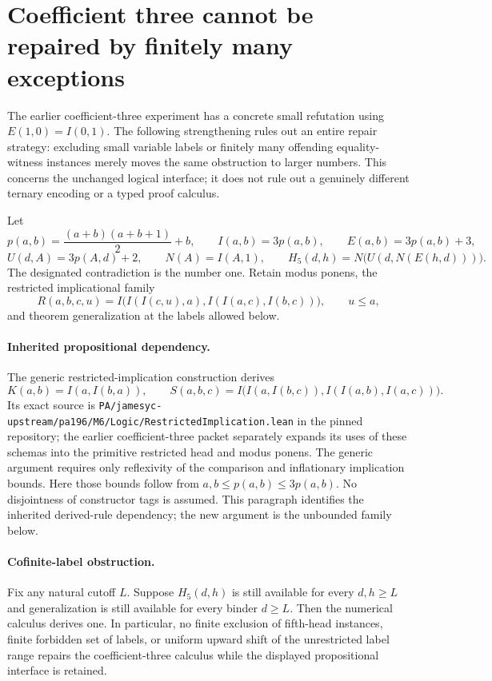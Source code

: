 \section{Coefficient three cannot be repaired by finitely many exceptions}
\label{sec:cofinite-collision}

The earlier coefficient-three experiment has a concrete small refutation
using $E(1,0)=I(0,1)$. The following strengthening rules out an entire
repair strategy: excluding small variable labels or finitely many offending
equality-witness instances merely moves the same obstruction to larger
numbers. This concerns the unchanged logical interface; it does not rule
out a genuinely different ternary encoding or a typed proof calculus.

Let
\[
 p(a,b)=\frac{(a+b)(a+b+1)}2+b,\qquad
 I(a,b)=3p(a,b),\qquad E(a,b)=3p(a,b)+3,
\]
\[
 U(d,A)=3p(A,d)+2,\qquad N(A)=I(A,1),\qquad
 H_5(d,h)=N\bigl(U(d,N(E(h,d)))\bigr).
\]
The designated contradiction is the number one. Retain modus ponens,
the restricted implicational family
\[
 R(a,b,c,u)=I\bigl(I(I(c,u),a),I(I(a,c),I(b,c))\bigr),
 \qquad u\leq a,
\]
and theorem generalization at the labels allowed below.

\paragraph{Inherited propositional dependency.}
The generic restricted-implication construction derives
\[
 K(a,b)=I(a,I(b,a)),\qquad
 S(a,b,c)=I\bigl(I(a,I(b,c)),I(I(a,b),I(a,c))\bigr).
\]
Its exact source is
\texttt{PA/jamesyc-upstream/pa196/M6/Logic/RestrictedImplication.lean}
in the pinned repository; the earlier coefficient-three packet separately
expands its uses of these schemas into the primitive restricted head and
modus ponens. The generic argument requires only reflexivity of the
comparison and inflationary implication bounds. Here those bounds follow
from $a,b\leq p(a,b)\leq3p(a,b)$. No disjointness of constructor tags is
assumed. This paragraph identifies the inherited derived-rule dependency;
the new argument is the unbounded family below.

\paragraph{Cofinite-label obstruction.}
Fix any natural cutoff $L$. Suppose $H_5(d,h)$ is still available for every
$d,h\geq L$ and generalization is still available for every binder
$d\geq L$. Then the numerical calculus derives one. In particular, no
finite exclusion of fifth-head instances, finite forbidden set of labels,
or uniform upward shift of the unrestricted label range repairs the
coefficient-three calculus while the displayed propositional interface
is retained.

